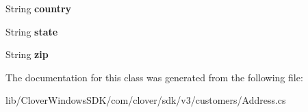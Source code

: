 \begin{DoxyCompactItemize}
\mbox{\label{classcom_1_1clover_1_1sdk_1_1v3_1_1customers_1_1_address_a98ae64269b0d9999ed54d23ffb292b89}} 
String {\bfseries country}
\item 
\mbox{\label{classcom_1_1clover_1_1sdk_1_1v3_1_1customers_1_1_address_aee454257d1c150cf06b2b90837e86fee}} 
String {\bfseries state}
\item 
\mbox{\label{classcom_1_1clover_1_1sdk_1_1v3_1_1customers_1_1_address_a93d8c78240079b9a465b74db05690af6}} 
String {\bfseries zip}
\end{DoxyCompactItemize}


The documentation for this class was generated from the following file\+:\begin{DoxyCompactItemize}
\item 
lib/\+Clover\+Windows\+S\+D\+K/com/clover/sdk/v3/customers/Address.\+cs\end{DoxyCompactItemize}
